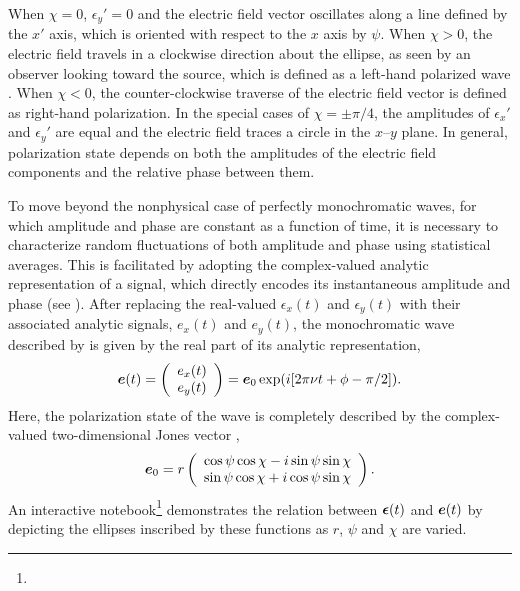 When $\chi = 0$, $\epsilon_y' = 0$ and the electric field vector oscillates along a line defined by the $x'$ axis, which
is oriented with respect to the $x$ axis by $\psi$.
%
When $\chi > 0$, 
the electric field travels in a clockwise direction about the ellipse, as seen by an observer looking toward the source, which is defined as a left-hand polarized wave \citep{ieee145}.
%
%
%
When $\chi < 0$, the counter-clockwise traverse of the electric field vector 
is defined as right-hand polarization.
%
In the special cases of $\chi = \pm \pi/4$, the amplitudes of $\epsilon_x'$ and $\epsilon_y'$ are equal and the electric field traces a circle in the $x$--$y$ plane.
%
In general, polarization state depends on both the amplitudes of the electric field components and the relative phase between them.  

To move beyond the nonphysical case of perfectly monochromatic waves, for which amplitude and phase are constant as a function of time, it is necessary to characterize random fluctuations of both amplitude and phase using statistical averages.  This is facilitated by adopting the complex-valued analytic representation of a signal, which directly encodes its instantaneous amplitude and phase (see ).
%
%
%
After replacing the real-valued $\epsilon_x(t)$ and $\epsilon_y(t)$ with their associated analytic signals, $e_x(t)$ and $e_y(t)$, the monochromatic wave described by  is given by the real part of its analytic representation,
\begin{equation}
\label{eqn:analytic_field}
\mbox{\boldmath $e$}(t) =
	\left( 
	\begin{array}{c}
		e_x(t) \\
		e_y(t)
	\end{array}
	\right) = \mbox{\boldmath $e$}_0 \exp(i [2\pi \nu t + \phi - \pi/2]).
\end{equation}
%
Here, the polarization state of the wave is completely described by the complex-valued two-dimensional Jones vector ,
\begin{equation}
\label{eqn:Jones_vector}
\mbox{\boldmath $e$}_0=r\left( \begin{array}{c}
    \cos\psi\cos\chi - i\sin\psi\sin\chi \\
    \sin\psi\cos\chi + i\cos\psi\sin\chi
  \end{array} \right).
\end{equation}
%
An interactive notebook\footnote{\nburl} demonstrates the relation between $\mbox{\boldmath $\epsilon$}(t)$ and $\mbox{\boldmath $e$}(t)$ by depicting the ellipses inscribed by these functions as $r$, $\psi$ and $\chi$ are varied.
